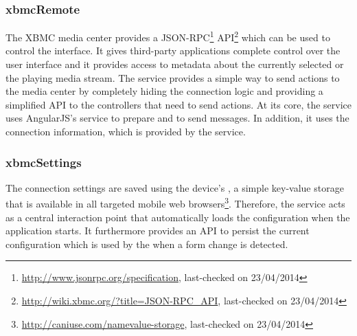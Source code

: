 \subsubsection{xbmcRemote}
\label{subsubsec:xbmcRemote}

The XBMC media center provides a JSON-RPC\footnote{\url{http://www.jsonrpc.org/specification}, last-checked on 23/04/2014} API\footnote{\url{http://wiki.xbmc.org/?title=JSON-RPC_API}, last-checked on 23/04/2014} which can be used to control the interface. It gives third-party applications complete control over the user interface and it provides access to metadata about the currently selected or the playing media stream. The  service provides a simple way to send actions to the media center by completely hiding the connection logic and providing a simplified API to the controllers that need to send actions. At its core, the service uses AngularJS's  service to prepare and to send messages. In addition, it uses the connection information, which is provided by the  service.

\subsubsection{xbmcSettings}
\label{subsubsec:xbmcSettings}

The connection settings are saved using the device's , a simple key-value storage that is available in all targeted mobile web browsers\footnote{\url{http://caniuse.com/namevalue-storage}, last-checked on 23/04/2014}. Therefore, the  service acts as a central interaction point that automatically loads the configuration when the application starts. It furthermore provides an API to persist the current configuration which is used by the  when a form change is detected.